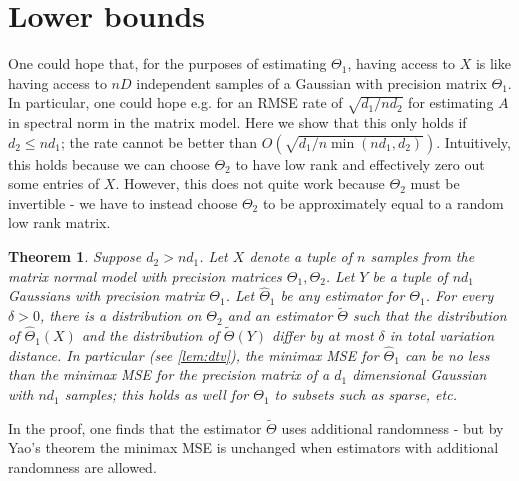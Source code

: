 \documentclass{article}
\newtheorem{theorem}{Theorem}
\newcommand{\CF}[1]{{\color{purple}[CF: #1]}}
\begin{document}
\section{Lower bounds}
One could hope that, for the purposes of estimating $\Theta_1$, having access to $X$ is like having access to $n D$ independent samples of a Gaussian with precision matrix $\Theta_1$. In particular, one could hope e.g. for an RMSE rate of $\sqrt{ d_1/ n d_2}$ for estimating $A$ in spectral norm in the matrix model. Here we show that this only holds if $d_2 \leq n d_1$; the rate cannot be better than $O(\sqrt{d_1/ n \min(n d_1, d_2)})$. Intuitively, this holds because we can choose $\Theta_2$ to have low rank and effectively zero out some entries of $X$. However, this does not quite work because $\Theta_2$ must be invertible - we have to instead choose $\Theta_2$ to be approximately equal to a random low rank matrix.

\begin{theorem}Suppose $d_2 > n d_1$. Let $X$ denote a tuple of $n$ samples from the matrix normal model with precision matrices $\Theta_1, \Theta_2$. Let $Y$ be a tuple of $nd_1$ Gaussians with precision matrix $\Theta_1$. Let $\hat{\Theta}_1$ be any estimator for $\Theta_1$. For every $\delta > 0$, there is a distribution on $\Theta_2$ and an estimator $\tilde{\Theta}$ such that the distribution of $\hat{\Theta}_1(X)$ and the distribution of $\tilde{\Theta}(Y)$ differ by at most $\delta$ in total variation distance. In particular (see \cref{lem:dtv}), the minimax MSE for $\widehat{\Theta}_1$ can be no less than the minimax MSE for the precision matrix of a $d_1$ dimensional Gaussian with $nd_1$ samples; this holds as well for $\Theta_1$ to subsets such as sparse, etc. %
\end{theorem}
In the proof, one finds that the estimator $\tilde{\Theta}$ uses additional randomness - but by Yao's theorem the minimax MSE is unchanged when estimators with additional randomness are allowed.
\end{document}
